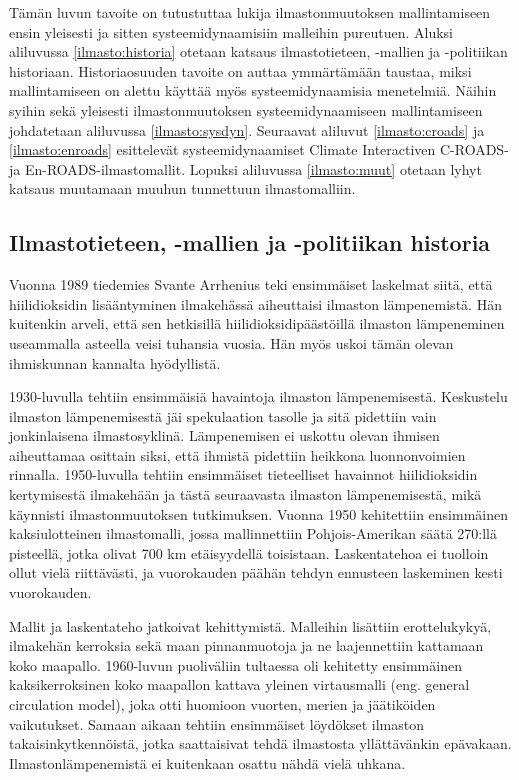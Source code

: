\documentclass[finnish,12pt,a4paper,pdftex]{article}
\begin{document}
\begin{onehalfspacing}
Tämän luvun tavoite on tutustuttaa lukija ilmastonmuutoksen mallintamiseen ensin yleisesti ja sitten systeemidynaamisiin malleihin pureutuen. Aluksi aliluvussa \ref{ilmasto:historia} otetaan katsaus ilmastotieteen, -mallien ja -politiikan historiaan. Historiaosuuden tavoite on auttaa ymmärtämään taustaa, miksi mallintamiseen on alettu käyttää myös systeemidynaamisia menetelmiä. Näihin syihin sekä yleisesti ilmastonmuutoksen systeemidynaamiseen mallintamiseen johdatetaan aliluvussa \ref{ilmasto:sysdyn}. Seuraavat aliluvut \ref{ilmasto:croads} ja \ref{ilmasto:enroads} esittelevät systeemidynaamiset Climate Interactiven C-ROADS- ja En-ROADS-ilmastomallit. Lopuksi aliluvussa \ref{ilmasto:muut} otetaan lyhyt katsaus muutamaan muuhun tunnettuun ilmastomalliin. 

\subsection{Ilmastotieteen, -mallien ja -politiikan historia \label{ilmasto:historia}}

Vuonna 1989 tiedemies Svante Arrhenius teki ensimmäiset laskelmat siitä, että hiilidioksidin lisääntyminen ilmakehässä aiheuttaisi ilmaston lämpenemistä. Hän kuitenkin arveli, että sen hetkisillä hiilidioksidipäästöillä ilmaston lämpeneminen useammalla asteella veisi tuhansia vuosia. Hän myös uskoi tämän olevan ihmiskunnan kannalta hyödyllistä. \cite{AmericanInstituteofPhysicsSimple}

1930-luvulla tehtiin ensimmäisiä havaintoja ilmaston lämpenemisestä. Keskustelu ilmaston lämpenemisestä jäi spekulaation tasolle ja sitä pidettiin vain jonkinlaisena ilmastosyklinä. Lämpenemisen ei uskottu olevan ihmisen aiheuttamaa osittain siksi, että ihmistä pidettiin heikkona luonnonvoimien rinnalla. 1950-luvulla tehtiin ensimmäiset tieteelliset havainnot hiilidioksidin kertymisestä ilmakehään ja tästä seuraavasta ilmaston lämpenemisestä, mikä käynnisti ilmastonmuutoksen tutkimuksen. \cite{AmericanInstituteofPhysics} Vuonna 1950 kehitettiin ensimmäinen kaksiulotteinen ilmastomalli, jossa mallinnettiin Pohjois-Amerikan säätä 270:llä pisteellä, jotka olivat 700 km etäisyydellä toisistaan. Laskentatehoa ei tuolloin ollut vielä riittävästi, ja vuorokauden päähän tehdyn ennusteen laskeminen kesti vuorokauden. \cite{AmericanInstituteofPhysicsGCM}

Mallit ja laskentateho jatkoivat kehittymistä. Malleihin lisättiin erottelukykyä, ilmakehän kerroksia sekä maan pinnanmuotoja ja ne laajennettiin kattamaan koko maapallo. 1960-luvun puoliväliin tultaessa oli kehitetty ensimmäinen kaksikerroksinen koko maapallon kattava yleinen virtausmalli (eng. general circulation model), joka otti huomioon vuorten, merien ja jäätiköiden vaikutukset. \cite{AmericanInstituteofPhysicsGCM} Samaan aikaan tehtiin ensimmäiset löydökset ilmaston takaisinkytkennöistä, jotka saattaisivat tehdä ilmastosta yllättävänkin epävakaan. Ilmastonlämpenemistä ei kuitenkaan osattu nähdä vielä uhkana. \cite{AmericanInstituteofPhysics} 


\end{onehalfspacing}
\end{document}
